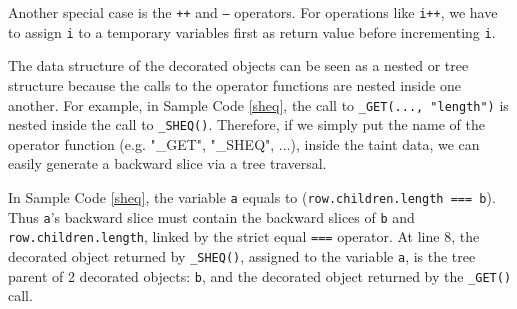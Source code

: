 Another special case is the {\tt ++} and {\tt --} operators.  For operations like {\tt i++}, we have to assign {\tt i} to a temporary variables first as return value before incrementing {\tt i}.


The data structure of the decorated objects can be seen as a nested or tree structure because the calls to the operator functions are nested inside one another.  For example, in Sample Code \ref{sheq}, the call to {\tt \_GET(..., "length")} is nested inside the call to {\tt \_SHEQ()}.  
Therefore, if we simply put the name of the operator function (e.g. "\_GET", "\_SHEQ", ...), inside the taint data, we can easily generate a backward slice via a tree traversal.  

In Sample Code \ref{sheq}, the variable {\tt a} equals to ({\tt row.children.length === b}).  Thus {\tt a}'s backward slice must contain the backward slices of {\tt b} and {\tt row.children.length}, linked by the strict equal {\tt ===} operator.  
At line 8, the decorated object returned by {\tt \_SHEQ()}, assigned to the variable {\tt a}, is the tree parent of 2 decorated objects: {\tt b}, and the decorated object returned by the {\tt \_GET()} call.  
